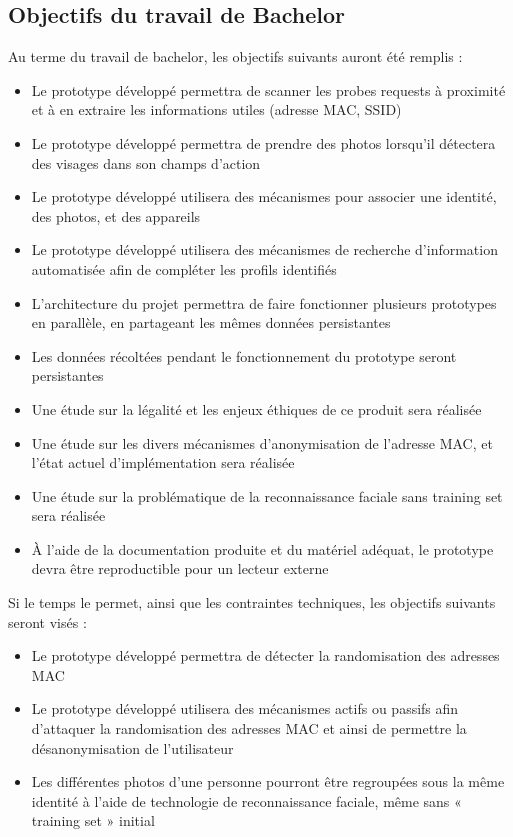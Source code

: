 \subsection*{Objectifs du travail de Bachelor}
Au terme du travail de bachelor, les objectifs suivants auront été remplis :
\begin{itemize}
\item Le prototype développé permettra de scanner les probes requests à proximité et à en extraire les
informations utiles (adresse MAC, SSID)
\item Le prototype développé permettra de prendre des photos lorsqu’il détectera des visages dans son champs
d’action
\item Le prototype développé utilisera des mécanismes pour associer une identité, des photos, et des appareils
\item Le prototype développé utilisera des mécanismes de recherche d’information automatisée afin de
compléter les profils identifiés
\item L’architecture du projet permettra de faire fonctionner plusieurs prototypes en parallèle, en partageant les
mêmes données persistantes
\item Les données récoltées pendant le fonctionnement du prototype seront persistantes
\item Une étude sur la légalité et les enjeux éthiques de ce produit sera réalisée
\item Une étude sur les divers mécanismes d’anonymisation de l’adresse MAC, et l’état actuel d’implémentation
sera réalisée
\item Une étude sur la problématique de la reconnaissance faciale sans training set sera réalisée
\item À l’aide de la documentation produite et du matériel adéquat, le prototype devra être reproductible pour
un lecteur externe
\end{itemize}

Si le temps le permet, ainsi que les contraintes techniques, les objectifs suivants seront visés :
\begin{itemize}
\item Le prototype développé permettra de détecter la randomisation des adresses MAC
\item Le prototype développé utilisera des mécanismes actifs ou passifs afin d’attaquer la randomisation des
adresses MAC et ainsi de permettre la désanonymisation de l’utilisateur
\item Les différentes photos d’une personne pourront être regroupées sous la même identité à l’aide de
technologie de reconnaissance faciale, même sans « training set » initial
\end{itemize}


